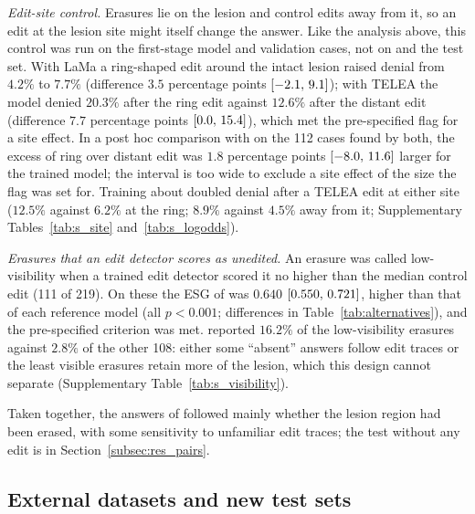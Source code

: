 \textit{Edit-site control.}
Erasures lie on the lesion and control edits away from it, so an edit at the lesion site might itself change the answer.
Like the analysis above, this control was run on the first-stage model and validation cases, not on \ms{} and the test set.
With LaMa a ring-shaped edit around the intact lesion raised denial from $4.2\%$ to $7.7\%$ (difference $3.5$ percentage points $[-2.1,\,9.1]$); with TELEA the model denied $20.3\%$ after the ring edit against $12.6\%$ after the distant edit (difference $7.7$ percentage points $[0.0,\,15.4]$), which met the pre-specified flag for a site effect.
In a post hoc comparison with \base{} on the 112 cases found by both, the excess of ring over distant edit was $1.8$ percentage points $[-8.0,\,11.6]$ larger for the trained model; the interval is too wide to exclude a site effect of the size the flag was set for.
Training about doubled denial after a TELEA edit at either site ($12.5\%$ against $6.2\%$ at the ring; $8.9\%$ against $4.5\%$ away from it; Supplementary Tables~\ref{tab:s_site} and~\ref{tab:s_logodds}).

\textit{Erasures that an edit detector scores as unedited.}
An erasure was called low-visibility when a trained edit detector scored it no higher than the median control edit (111 of 219).
On these the ESG of \ms{} was $0.640$ $[0.550,\,0.721]$, higher than that of each reference model (all $p < 0.001$; differences in Table~\ref{tab:alternatives}), and the pre-specified criterion was met.
\ms{} reported $16.2\%$ of the low-visibility erasures against $2.8\%$ of the other 108: either some ``absent'' answers follow edit traces or the least visible erasures retain more of the lesion, which this design cannot separate (Supplementary Table~\ref{tab:s_visibility}).

Taken together, the answers of \ms{} followed mainly whether the lesion region had been erased, with some sensitivity to unfamiliar edit traces; the test without any edit is in Section~\ref{subsec:res_pairs}.

\subsection{External datasets and new test sets}\label{subsec:res_external}

